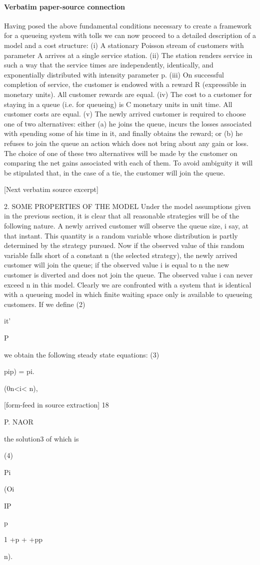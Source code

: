 \documentclass[10pt]{article}
\begin{document}
\paragraph{Verbatim paper-source connection}
\begin{ReviewVerbatim}
Having posed the above fundamental conditions necessary to create a framework for a queueing system with tolls we can now proceed to a detailed description of a model and a cost structure:
(i) A stationary Poisson stream of customers with parameter A arrives at a
single service station.
(ii) The station renders service in such a way that the service times are independently, identically, and exponentially distributed with intensity parameter p.
(iii) On successful completion of service, the customer is endowed with a reward
R (expressible in monetary units). All customer rewards are equal.
(iv) The cost to a customer for staying in a queue (i.e. for queueing) is C monetary units in unit time. All customer costs are equal.
(v) The newly arrived customer is required to choose one of two alternatives:
either (a) he joins the queue, incurs the losses associated with spending some of
his time in it, and finally obtains the reward; or (b) he refuses to join the queue an
action which does not bring about any gain or loss. The choice of one of these two
alternatives will be made by the customer on comparing the net gains associated
with each of them. To avoid ambiguity it will be stipulated that, in the case of a tie,
the customer will join the queue.

[Next verbatim source excerpt]

2. SOME PROPERTIES OF THE MODEL
Under the model assumptions given in the previous section, it is clear that all
reasonable strategies will be of the following nature. A newly arrived customer
will observe the queue size, i say, at that instant. This quantity is a random variable
whose distribution is partly determined by the strategy pursued. Now if the observed value of this random variable falls short of a constant n (the selected strategy),
the newly arrived customer will join the queue; if the observed value i is equal to n
the new customer is diverted and does not join the queue. The observed value i
can never exceed n in this model.
Clearly we are confronted with a system that is identical with a queueing model
in which finite waiting space only is available to queueing customers. If we define
(2)

it'

P

we obtain the following steady state equations:
(3)

pip) = pi.

(0n<i< n),


[form-feed in source extraction]
18

P. NAOR

the solution3 of which is

(4)

Pi

(Oi

IP

p

1 +p + +pp

n).
\end{ReviewVerbatim}
\end{document}
